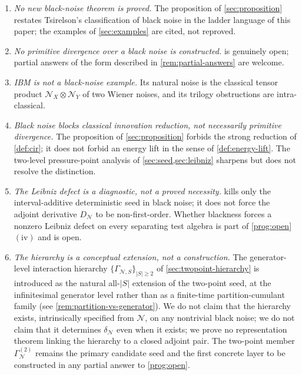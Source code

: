 \documentclass[11pt,reqno]{amsart}
\theoremstyle{plain}
\theoremstyle{definition}
\theoremstyle{remark}
\begin{document}
\begin{enumerate}
\item[$(\mathrm 1)$] \emph{No new black-noise theorem is proved.}
The proposition of \cref{sec:proposition} restates Tsirelson's
classification of black noise in the ladder language of this paper;
the examples of \cref{sec:examples} are cited, not reproved.

\item[$(\mathrm 2)$] \emph{No primitive divergence over a black noise
is constructed.}  is genuinely open; partial answers
of the form described in \cref{rem:partial-answers} are welcome.

\item[$(\mathrm 3)$] \emph{IBM is not a black-noise example.} Its
natural noise is the classical tensor product
$\mathcal N_X\otimes\mathcal N_Y$ of two Wiener noises, and its
trilogy obstructions are intra-classical.

\item[$(\mathrm 4)$] \emph{Black noise blocks classical innovation
reduction, not necessarily primitive divergence.} The proposition
of \cref{sec:proposition} forbids the strong reduction of
\cref{def:cir}; it does not forbid an energy lift in the sense of
\cref{def:energy-lift}. The two-level pressure-point analysis of
\cref{sec:seed,sec:leibniz} sharpens but does not resolve the
distinction.

\item[$(\mathrm 5)$] \emph{The Leibniz defect is a diagnostic, not a
proved necessity.}  kills only the
interval-additive deterministic seed in black noise; it does not
force the adjoint derivative $D_{\mathcal N}$ to be non-first-order.
Whether blackness forces a nonzero Leibniz defect on every separating
test algebra is part of \cref{prog:open}$(\mathrm{iv})$ and is open.

\item[$(\mathrm 6)$] \emph{The hierarchy is a conceptual extension,
not a construction.} The generator-level interaction hierarchy
$\{\Gamma_{\mathcal N,S}\}_{|S|\ge 2}$ of
\cref{sec:twopoint-hierarchy} is introduced as the natural
all-$|S|$ extension of the two-point seed, at the infinitesimal
generator level rather than as a finite-time partition-cumulant
family (see \cref{rem:partition-vs-generator}). We do not claim
that the hierarchy exists, intrinsically specified from
$\mathcal N$, on any nontrivial black noise; we do not claim that it
determines $\delta_{\mathcal N}$ even when it exists; we prove no
representation theorem linking the hierarchy to a closed adjoint
pair. The two-point member $\Gamma_{\mathcal N}^{(2)}$ remains the
primary candidate seed and the first concrete layer to be
constructed in any partial answer to \cref{prog:open}.
\end{enumerate}
\end{document}
